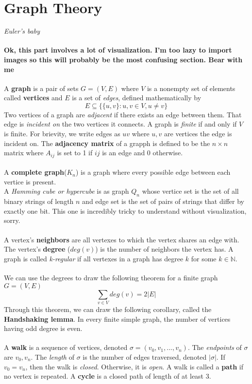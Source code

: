 \documentclass{article}
\begin{document}
\section{Graph Theory}
\textit{Euler's baby}
\\\\
\textbf{Ok, this part involves a lot of visualization. I'm too lazy to import images so this will probably be the most confusing section. Bear with me}
\\\\
A \textbf{graph} is a pair of sets $G=(V,E)$ where $V$ is a nonempty set of elements called \textbf{vertices} and $E$ is a set of \textit{edges}, defined mathematically by
\[ E\subseteq \{\{u,v\}:u,v\in V, u\ne v\}\]
Two vertices of a graph are \textit{adjacent} if there exists an edge between them. That edge is \textit{incident on} the two vertices it connects. A graph is \textit{finite} if and only if $V$ is finite. For brievity, we write edges as $uv$ where $u,v$ are vertices the edge is incident on. The \textbf{adjacency matrix} of a grapph is defined to be the $n\times n$ matrix where $A_{ij}$ is set to 1 if $ij$ is an edge and 0 otherwise.
\\\\
A \textbf{complete graph}($K_n$) is a graph where every possible edge between each vertice is present.
\\
A \textit{Hamming cube or hypercube} is as graph $Q_n$ whose vertice set is the set of all binary strings of length $n$ and edge set is the set of pairs of strings that differ by exactly one bit. This one is incredibly tricky to understand without visualization, sorry.
\\\\
A vertex's \textbf{neighbors} are all vertexes to which the vertex shares an edge with. The vertex's \textbf{degree} ($deg(v)$) is the number of neighbors the vertex has. A graph is called \textit{k-regular} if all vertexes in a graph has degree $k$ for some $k\in\mathds{N}$.
\\\\
We can use the degrees to draw the following theorem for a finite graph $G=(V,E)$
\[\sum_{v\in V} deg(v) = 2|E|\]
Through this theorem, we can draw the following corollary, called the \textbf{Handshaking lemma}. In every finite simple graph, the number of vertices having odd degree is even.
\\\\
A \textbf{walk} is a sequence of vertices, denoted $\sigma = (v_0,v_1,...,v_n)$. The \textit{endpoints} of $\sigma$ are $v_0,v_n$. The \textit{length} of $\sigma$ is the number of edges traversed, denoted $|\sigma|$. If $v_0=v_n$, then the walk is \textit{closed}. Otherwise, it is \textit{open}. A walk is called a \textbf{path} if no vertex is repeated. A \textbf{cycle} is a closed path of length of at least 3.
\end{document}
